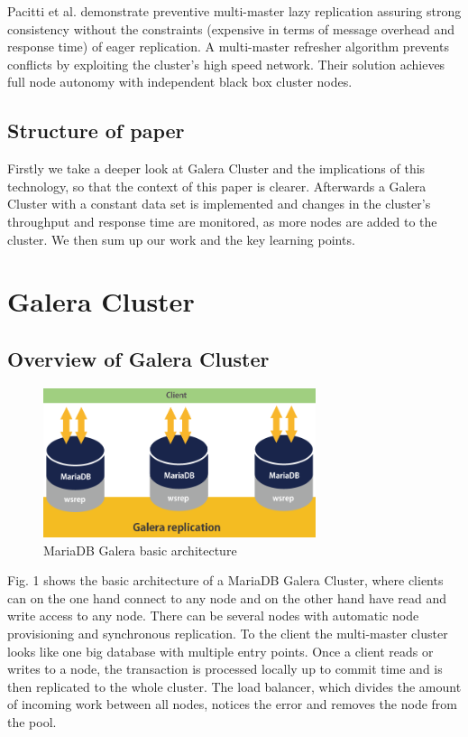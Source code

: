 \documentclass{sig-alternate}
\begin{document}
Pacitti et al. \cite{pacitti2003preventive} demonstrate preventive multi-master lazy replication assuring strong consistency without the constraints (expensive in terms of message overhead and response time) of eager replication. A multi-master refresher algorithm prevents conflicts by exploiting the cluster’s high speed network. Their solution achieves full node autonomy with independent black box cluster nodes.

\subsection{Structure of paper}
Firstly we take a deeper look at Galera Cluster and the implications of this technology, so that the context of this paper is clearer. Afterwards a Galera Cluster with a constant data set is implemented and changes in the cluster’s throughput and response time are monitored, as more nodes are added to the cluster. We then sum up our work and the key learning points.

\section{Galera Cluster}
\subsection{Overview of Galera Cluster}

\begin{figure}[h]
\centering
\includegraphics[width=8cm]{galera1.png}
\caption{MariaDB Galera basic architecture \cite{xyxon}}
\end{figure}

Fig. 1 shows the basic architecture of a MariaDB Galera Cluster, where clients can on the one hand connect to any node and on the other hand have read and write access to any node. There can be several nodes with automatic node provisioning and synchronous replication. To the client the multi-master cluster looks like one big database with multiple entry points. Once a client reads or writes to a node, the transaction is processed locally up to commit time and is then replicated to the whole cluster. The load balancer, which divides the amount of incoming work between all nodes, notices the error and removes the node from the pool.
\end{document}
